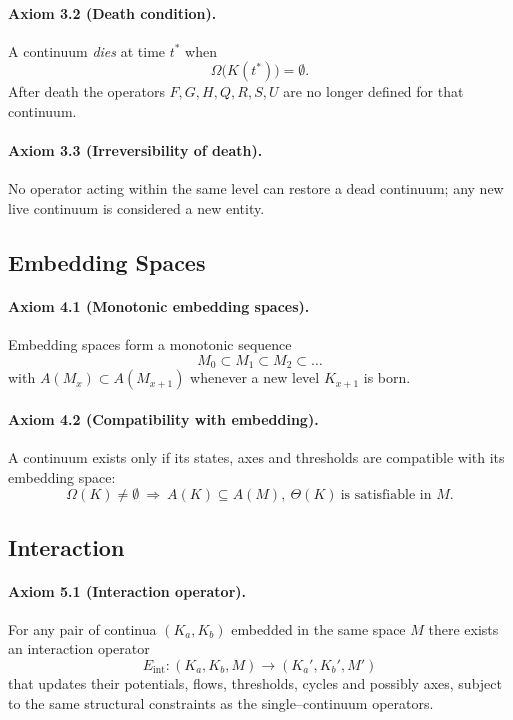 \paragraph{Axiom 3.2 (Death condition).}
A continuum \emph{dies} at time \(t^{\ast}\) when
\[
  \Omega\big(K(t^{\ast})\big) = \emptyset.
\]
After death the operators \(F,G,H,Q,R,S,U\) are no longer defined for that
continuum.

\paragraph{Axiom 3.3 (Irreversibility of death).}
No operator acting within the same level can restore a dead continuum; any new
live continuum is considered a new entity.

\subsection{Embedding Spaces}

\paragraph{Axiom 4.1 (Monotonic embedding spaces).}
Embedding spaces form a monotonic sequence
\[
  M_0 \subset M_1 \subset M_2 \subset \dots
\]
with
\(A(M_x)\subset A(M_{x+1})\) whenever a new level \(K_{x+1}\) is born.

\paragraph{Axiom 4.2 (Compatibility with embedding).}
A continuum exists only if its states, axes and thresholds are compatible with
its embedding space:
\[
  \Omega(K)\neq\emptyset
  \ \Longrightarrow\
  A(K)\subseteq A(M),\
  \Theta(K) \ \text{is satisfiable in } M.
\]

\subsection{Interaction}

\paragraph{Axiom 5.1 (Interaction operator).}
For any pair of continua \((K_a,K_b)\) embedded in the same space \(M\) there
exists an interaction operator
\[
  E_{\mathrm{int}} : (K_a,K_b,M) \to (K_a',K_b',M')
\]
that updates their potentials, flows, thresholds, cycles and possibly axes,
subject to the same structural constraints as the single--continuum operators.


